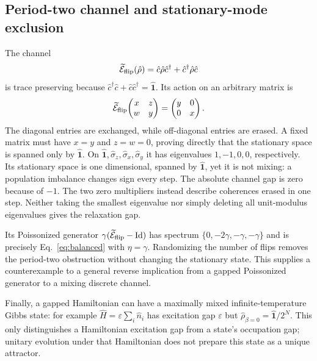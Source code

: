 \documentclass[aps,prb,onecolumn,nofootinbib,superscriptaddress,floatfix]{revtex4-2}
\newcommand{\Id}{\hat{\mathbf 1}}
\newcommand{\E}{\widetilde{\mathcal E}}
\begin{document}
\subsection{Period-two channel and stationary-mode exclusion}
The channel
\begin{equation}
 \E_{\rm flip}(\hat\rho)=\hat c\hat\rho\hat c^\dagger
                         +\hat c^\dagger\hat\rho\hat c
 \label{eq:flip}
\end{equation}
is trace preserving because $\hat c^\dagger\hat c+
\hat c\hat c^\dagger=\Id$. Its action on an arbitrary matrix is
\begin{equation}
 \E_{\rm flip}\!
 \begin{pmatrix}x&z\\w&y\end{pmatrix}
       =\begin{pmatrix}y&0\\0&x\end{pmatrix}.
 \label{eq:flip_matrix}
\end{equation}
The diagonal entries are exchanged, while off-diagonal entries are
erased. A fixed matrix must have $x=y$ and $z=w=0$, proving
directly that the stationary space is spanned only by $\Id$.
On $\Id,\hat\sigma_z,
\hat\sigma_x,\hat\sigma_y$ it has eigenvalues
$1,-1,0,0$, respectively. Its stationary space is one dimensional,
spanned by $\Id$, yet it is not mixing: a population imbalance changes
sign every step. The absolute channel gap is zero because of $-1$.
The two zero multipliers instead describe coherences erased in one
step. Neither taking the smallest eigenvalue nor simply deleting
all unit-modulus eigenvalues gives the relaxation gap.

Its Poissonized generator $\gamma(\E_{\rm flip}-\mathrm{Id})$
has spectrum $\{0,-2\gamma,-\gamma,-\gamma\}$ and is precisely
Eq.~\eqref{eq:balanced} with $\eta=\gamma$. Randomizing the number
of flips removes the period-two obstruction without changing the
stationary state. This supplies a counterexample to a general
reverse implication from a gapped Poissonized generator to a
mixing discrete channel.

Finally, a gapped Hamiltonian can have a maximally mixed
infinite-temperature Gibbs state: for example
$\hat H=\varepsilon\sum_i\hat n_i$ has excitation gap $\varepsilon$
but $\hat\rho_{\beta=0}=\Id/2^N$. This only distinguishes a
Hamiltonian excitation gap from a state's occupation gap; unitary
evolution under that Hamiltonian does not prepare this state as a
unique attractor.
\end{document}

